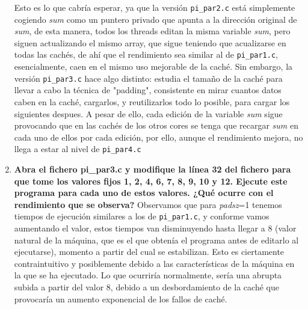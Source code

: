 \documentclass{report}
\newcommand\tab[1][0.6cm]{\hspace*{#1}}
\newcommand\nl{\newline\tab}
\begin{document}
\begin{enumerate}
{			Esto es lo que cabría esperar, ya que la versión \texttt{pi\_par2.c} está simplemente cogiendo \textit{sum} como un puntero privado que apunta a la dirección original de \textit{sum},
			de esta manera, todos los threads editan la misma variable \textit{sum}, pero siguen actualizando el mismo array, que sigue teniendo que acualizarse en todas las cachés, de ahí que el rendimiento sea similar al de \texttt{pi\_par1.c}, esencialmente, caen en el mismo uso mejorable de la caché. Sin embargo, la versión \texttt{pi\_par3.c} hace algo distinto: estudia el tamaño de la caché para llevar a cabo la técnica de "padding", consistente en mirar cuantos datos caben en la caché, cargarlos, y reutilizarlos todo lo posible, para cargar los siguientes despues. A pesar de ello, cada edición de la variable \textit{sum} sigue provocando que en las cachés de los otros cores se tenga que recargar \textit{sum} en cada uno de ellos por cada edición, por ello, aunque el rendimiento mejora, no llega a estar al nivel de \texttt{pi\_par4.c}}
		\item {\textbf{\tab Abra el fichero pi\_par3.c y modifique la línea 32 del fichero para que tome los valores fijos 1, 2, 4, 6, 7, 8, 9, 10 y 12. Ejecute este programa para cada uno de estos valores. ¿Qué ocurre con el rendimiento que se observa?}\nl
			Observamos que para \textit{padsz}=1 tenemos tiempos de ejecución similares a los de \texttt{pi\_par1.c}, y conforme vamos aumentando el valor, estos tiempos van disminuyendo hasta llegar a 8 (valor natural de la máquina, que es el que obtenía el programa antes de editarlo al ejecutarse), momento a partir del cual se estabilizan. Esto es ciertamente contraintuitivo y posiblemente debido a las características de la máquina en la que se ha ejecutado. Lo que ocurriría normalmente, sería una abrupta subida a partir del valor 8, debido a un desbordamiento de la caché que provocaría un aumento exponencial de los fallos de caché.
		}
		
		
	\end{enumerate}
	\newpage
\end{document}
